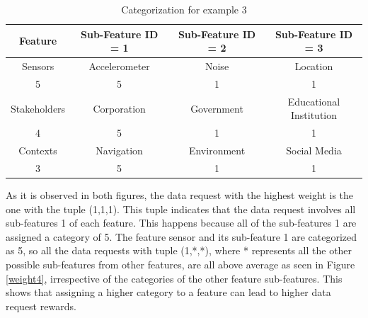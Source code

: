 \begin{table}[h!]
  \centering
  \caption{Categorization for example 3}
  \label{tab:scenario4}
  \begin{tabular}{cccc}
    \toprule
    Feature & Sub-Feature ID = 1 & Sub-Feature ID = 2 & Sub-Feature ID = 3\\
    \midrule
    Sensors & Accelerometer & Noise & Location\\
     5 & 5 & 1 & 1\\ \hhline{====}
     Stakeholders & Corporation & Government & Educational Institution\\
     4 & 5 & 1 & 1\\ \hhline{====}
     Contexts & Navigation & Environment & Social Media\\
     3 & 5 & 1 & 1\\ 
    \bottomrule
  \end{tabular}
\end{table}

As it is observed in both figures, the data request with the highest weight is the one with the tuple (1,1,1). This tuple indicates that the data request involves all sub-features 1 of each feature. This happens because all of the sub-features 1 are assigned a category of 5. The feature sensor and its sub-feature 1 are categorized as 5, so all the data requests
with tuple (1,*,*), where * represents all the other possible sub-features from other features, are all above average as seen in Figure \ref{weight4}, irrespective of the categories of the other feature sub-features. This shows that assigning a higher category to a feature can lead to higher data request rewards. 



%

